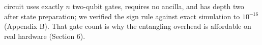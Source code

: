 %
%

circuit uses exactly \(n\) two-qubit gates, requires no ancilla, and has
depth two after state preparation; we verified the sign rule against exact
simulation to \(10^{-16}\) (Appendix B). That gate count is why the
entangling overhead is affordable on real hardware (Section 6).
